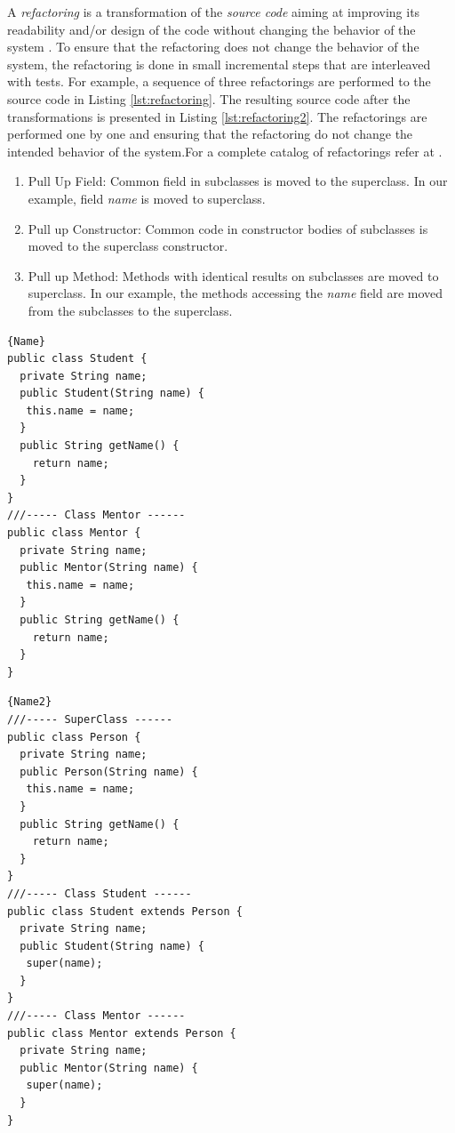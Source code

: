 A \textit{refactoring} is a transformation of the \textit{source code} aiming at improving its readability and/or design of the code without changing the behavior of the system \cite{Fowler2000}. To ensure that the refactoring does not change the behavior of the system, the refactoring is done in small incremental steps that are interleaved with tests. 
For example, a sequence of three refactorings are performed to the source code in Listing \ref{lst:refactoring}.
The resulting source code after the transformations is presented in Listing  \ref{lst:refactoring2}. The refactorings are performed one by one and ensuring that the refactoring do not change the intended behavior of the system.For a complete catalog of  refactorings refer at \cite{Fowler2000}. 

\begin{enumerate}
\item Pull Up Field: Common field in subclasses is moved to the superclass. In our example, field \textit{name} is moved to superclass. 
\item Pull up Constructor: Common code in constructor bodies of subclasses is moved to the superclass constructor. 
\item Pull up Method: Methods with identical results on subclasses are moved to superclass. In our example, the methods accessing the \textit{name} field are moved from the subclasses to the superclass. 
\end{enumerate}


\noindent\begin{minipage}{.45\textwidth}
\begin{lstlisting}[style=java,caption=Before refactorings,label=lst:refactoring]{Name}
public class Student {
  private String name;
  public Student(String name) {
   this.name = name;
  }
  public String getName() {
	return name;
  }
}
///----- Class Mentor ------
public class Mentor {
  private String name;
  public Mentor(String name) {
   this.name = name;
  }
  public String getName() {
	return name;
  }
}
\end{lstlisting}
\end{minipage}\hfill
\begin{minipage}{.45\textwidth}
\begin{lstlisting}[style=java,caption=After refactorings,label=lst:refactoring2]{Name2}
///----- SuperClass ------
public class Person {
  private String name;
  public Person(String name) {
   this.name = name;
  }
  public String getName() {
	return name;
  }
}
///----- Class Student ------
public class Student extends Person {
  private String name;
  public Student(String name) {
   super(name);
  }
}
///----- Class Mentor ------
public class Mentor extends Person {
  private String name;
  public Mentor(String name) {
   super(name);
  }
}
\end{lstlisting}
\end{minipage}

